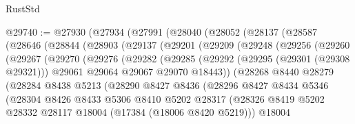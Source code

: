 \begin{lexlean}{RustStd}
\begin{coremodule}
@29740 := @27930
    (@27934
      (@27991
        (@28040
          (@28052
            (@28137
              (@28587
                (@28646
                  (@28844
                    (@28903
                      (@29137
                        (@29201
                          (@29209
                            (@29248
                              (@29256
                                (@29260
                                  (@29267
                                    (@29270
                                      (@29276
                                        (@29282
                                          (@29285
                                            (@29292
                                              (@29295 (@29301 (@29308 @29321)))
                                              @29061
                                              @29064
                                              @29067
                                              @29070
                                              @18443))
                                          (@28268
                                            @8440
                                            @28279
                                            (@28284
                                              @8438
                                              @5213
                                              (@28290
                                                @8427
                                                @8436
                                                (@28296
                                                  @8427
                                                  @8434
                                                  @5346
                                                  (@28304
                                                    @8426
                                                    @8433
                                                    @5306
                                                    @8410
                                                    @5202
                                                    @28317
                                                    (@28326
                                                      @8419
                                                      @5202
                                                      @28332
                                                      @28117
                                                      @18004
                                                      (@17384 (@18006 @8420 @5219)))
                                                    @18004

\end{coremodule}
\end{lexlean}
